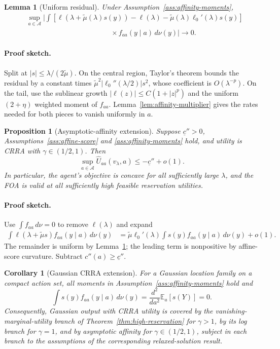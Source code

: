 \documentclass[11pt]{article}
\newtheorem{proposition}{Proposition}
\newtheorem{lemma}{Lemma}
\newtheorem{corollary}{Corollary}
\theoremstyle{remark}
\newcommand{\E}{\mathbb E}
\newcommand{\dd}{\,d\nu}
\newcommand{\cA}{\mathcal A}
\newcommand{\proofsketch}{\paragraph{Proof sketch.}}
\begin{document}
\begin{lemma}[Uniform residual]
\label{lem:uniform-residual}
Under Assumption~\ref{ass:affinity-moments},
\begin{equation}
\begin{aligned}
 &\sup_{a\in\cA}\Bigg|
 \int\left[
  \ell(\lambda+\widetilde\mu(\lambda)s(y))-\ell(\lambda)
  -\widetilde\mu(\lambda)\ell_0'(\lambda)s(y)
 \right]
 \\[-2pt]
 &\hspace{5cm}{}
 \times f_{aa}(y\mid a)\dd(y)
 \Bigg|\longrightarrow0.
\end{aligned}
\tag{R}\label{eq:residual}
\end{equation}
\end{lemma}

\proofsketch
Split at $|s|\le \lambda/(2\widetilde\mu)$.  On the central region, Taylor's theorem
bounds the residual by a constant times
$\widetilde\mu^2|\ell_0''(\lambda/2)|s^2$, whose coefficient is $O(\lambda^{-p})$.
On the tail, use the sublinear growth $|\ell(z)|\le C(1+|z|^p)$ and the uniform
$(2+\eta)$ weighted moment of $f_{aa}$.  Lemma~\ref{lem:affinity-multiplier}
gives the rates needed for both pieces to vanish uniformly in $a$.

\begin{proposition}[Asymptotic-affinity extension]
\label{prop:asymptotic-affinity}
Suppose $\underline c''>0$, Assumptions~\ref{ass:affine-score} and
\ref{ass:affinity-moments} hold, and utility is CRRA with
$\gamma\in(1/2,1)$.  Then
\[
 \sup_{a\in\cA}
 \widehat U_{aa}(v_\lambda,a)
 \le-\underline c''+o(1).
\]
In particular, the agent's objective is concave for all sufficiently large
$\lambda$, and the FOA is valid at all sufficiently high feasible reservation
utilities.
\end{proposition}

\proofsketch
Use $\int f_{aa}\dd=0$ to remove $\ell(\lambda)$ and expand
\begin{align*}
 \int \ell(\lambda+\widetilde\mu s)f_{aa}(y\mid a)\dd(y)
 &=\widetilde\mu\ell_0'(\lambda)
   \int s(y)f_{aa}(y\mid a)\dd(y)+o(1).
\end{align*}
The remainder is uniform by Lemma~\ref{lem:uniform-residual}; the leading term is
nonpositive by affine-score curvature.  Subtract $c''(a)\ge\underline c''$.

\begin{corollary}[Gaussian CRRA extension]
For a Gaussian location family on a compact action set, all moments in
Assumption~\ref{ass:affinity-moments} hold and
\[
 \int s(y)f_{aa}(y\mid a)\dd(y)
 =\frac{d^2}{da^2}\E_a[s(Y)]=0.
\]
Consequently, Gaussian output with CRRA utility is covered by the
vanishing-marginal-utility branch of Theorem~\ref{thm:high-reservation} for
$\gamma>1$,
by its log branch for $\gamma=1$, and by asymptotic affinity for
$\gamma\in(1/2,1)$, subject in each branch to the assumptions of the corresponding
relaxed-solution result.
\end{corollary}
\end{document}
